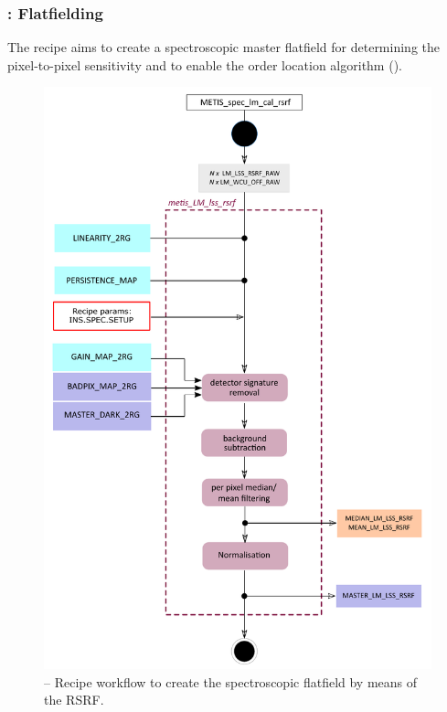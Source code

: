 \subsubsection{:  Flatfielding}\label{rec:metis_lm_lss_rsrf}
The recipe  aims to create a spectroscopic master flatfield for determining the pixel-to-pixel sensitivity and to enable the order location algorithm ().
\begin{figure}[ht]
  \centering
  \includegraphics[width=0.5\textheight]{figures/metis_lm_lss_rsrf_v0.84.pdf}
  \caption[Recipe: ]{ --
    Recipe workflow to create the spectroscopic flatfield by means of the \ac{RSRF}.}
  \label{Fig:rec_lm_lss_rsrf}
\end{figure}

